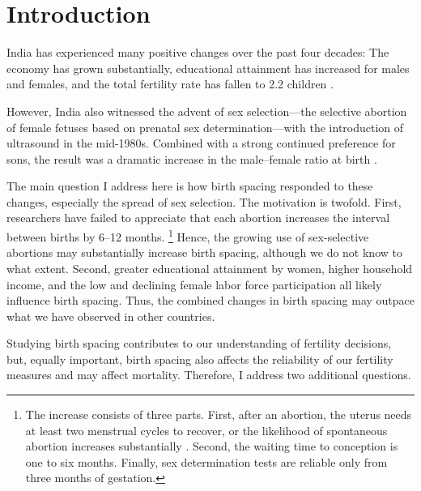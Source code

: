 \documentclass[12pt,letterpaper]{article}
\begin{document}
\newpage



\section{Introduction\label{sec:intro}}



India has experienced many positive changes over the past four decades:
The economy has grown substantially,
educational attainment has increased for males and females,
and the total fertility rate has fallen to 2.2 children
\citep{Bosworth2008,Dharmalingam2014,
International-Institute-for-Population-Sciences-IIPS2017}.

However, India also witnessed the advent of sex selection---the selective abortion of 
female fetuses based on prenatal sex determination---with the introduction of ultrasound 
in the mid-1980s.
Combined with a strong continued preference for sons, the result was a dramatic increase 
in the male--female ratio at birth
\citep{das_gupta97,Arnold2002,retherford03b,Guilmoto2012,Portner2015b,Jayachandran2017}.


The main question I address here is how birth spacing responded to these changes, 
especially the spread of sex selection. 
The motivation is twofold.
First, researchers have failed to appreciate that each abortion increases the
interval between births by 6--12 months.%
\footnote{
The increase consists of three parts. 
First, after an abortion, the uterus needs at least two menstrual cycles to recover, 
or the likelihood of spontaneous abortion increases substantially \citep{zhou00b}. 
Second, the waiting time to conception is one to six months. 
Finally, sex determination tests are reliable only from three months of gestation. 
}
Hence, the growing use of sex-selective abortions may substantially increase birth spacing, 
although we do not know to what extent. 
Second, greater educational attainment by women, higher household income, and the low and 
declining female labor force participation all likely influence birth spacing. 
Thus, the combined changes in birth spacing may outpace what we have observed in 
other countries.

Studying birth spacing contributes to our understanding of fertility decisions, but, equally 
important, birth spacing also affects the reliability of our fertility measures and may 
affect mortality. 
Therefore, I address two additional questions. 
\end{document}
